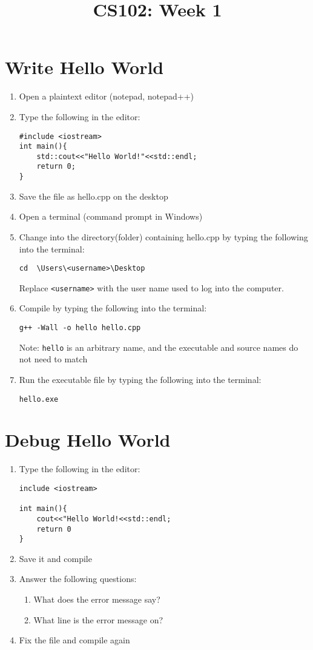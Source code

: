 \documentclass{article}
\begin{document}
\title{CS102: Week 1}

\maketitle

\section*{Write Hello World}
\begin{enumerate}
\item Open a plaintext editor (notepad, notepad++)
\item Type the following in the editor:
\begin{verbatim}
#include <iostream>
int main(){
	std::cout<<"Hello World!"<<std::endl;
	return 0;
}
\end{verbatim}
\item Save the file as hello.cpp on the desktop
\item Open a terminal (command prompt in Windows)
\item Change into the directory(folder) containing hello.cpp by typing the following into the terminal: 
\begin{verbatim}
cd  \Users\<username>\Desktop
\end{verbatim}
Replace \texttt{<username>} with the user name used to log into the computer.

\item Compile by typing the following into the terminal:
\begin{verbatim}
g++ -Wall -o hello hello.cpp
\end{verbatim}
Note: \texttt{hello} is an arbitrary name, and the executable and source names do not need to match

\item Run the executable file by typing the following into the terminal:
\begin{verbatim}
hello.exe
\end{verbatim}

\end{enumerate}
\pagebreak
\section*{Debug Hello World}
\begin{enumerate}
\item Type the following in the editor:
\begin{verbatim}
include <iostream>
	
int main(){
	cout<<"Hello World!<<std::endl;
	return 0
}
\end{verbatim}
\item Save it and compile
\\
\item Answer the following questions:
	\begin{enumerate}
		\item What does the error message say?
		\item What line is the error message on?
	\end{enumerate}
\item Fix the file and compile again
\end{enumerate}
\end{document}
